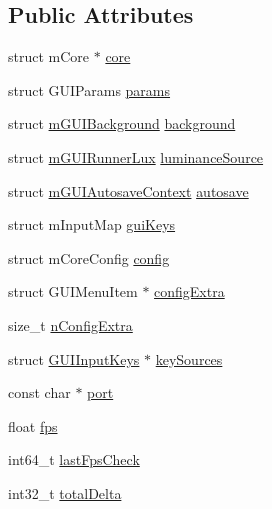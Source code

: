 \subsection*{Public Attributes}
\begin{DoxyCompactItemize}
\item 
struct m\+Core $\ast$ \mbox{\hyperlink{structm_g_u_i_runner_a52a31925364af537d99578c05be47a47}{core}}
\item 
struct G\+U\+I\+Params \mbox{\hyperlink{structm_g_u_i_runner_a83281818205165da912afcfe67b7fbf3}{params}}
\item 
struct \mbox{\hyperlink{gui-runner_8h_structm_g_u_i_background}{m\+G\+U\+I\+Background}} \mbox{\hyperlink{structm_g_u_i_runner_a0f417434c1a9f376e778d385d39953ec}{background}}
\item 
struct \mbox{\hyperlink{gui-runner_8h_structm_g_u_i_runner_lux}{m\+G\+U\+I\+Runner\+Lux}} \mbox{\hyperlink{structm_g_u_i_runner_ae102dc4facc6e333fe1c961279cf8bef}{luminance\+Source}}
\item 
struct \mbox{\hyperlink{gui-runner_8h_structm_g_u_i_autosave_context}{m\+G\+U\+I\+Autosave\+Context}} \mbox{\hyperlink{structm_g_u_i_runner_ae240ad533c323de58caba287697c88de}{autosave}}
\item 
struct m\+Input\+Map \mbox{\hyperlink{structm_g_u_i_runner_a9ceaca50250567be0eb05dbed7d24f22}{gui\+Keys}}
\item 
struct m\+Core\+Config \mbox{\hyperlink{structm_g_u_i_runner_acd48b0c2ab368441512307eafc4b91da}{config}}
\item 
struct G\+U\+I\+Menu\+Item $\ast$ \mbox{\hyperlink{structm_g_u_i_runner_a90ecf79ced741b7b1aee02812fa0163c}{config\+Extra}}
\item 
size\+\_\+t \mbox{\hyperlink{structm_g_u_i_runner_a54ba5f9d02813ed3b5dcbbfbe33ca7d7}{n\+Config\+Extra}}
\item 
struct \mbox{\hyperlink{remap_8h_struct_g_u_i_input_keys}{G\+U\+I\+Input\+Keys}} $\ast$ \mbox{\hyperlink{structm_g_u_i_runner_a580d09813596287456dde1f1b7da3543}{key\+Sources}}
\item 
const char $\ast$ \mbox{\hyperlink{structm_g_u_i_runner_abcc7f6fccde67999c548f62891e64602}{port}}
\item 
float \mbox{\hyperlink{structm_g_u_i_runner_a70d52f6a42123a481384cca59dbdbaf3}{fps}}
\item 
int64\+\_\+t \mbox{\hyperlink{structm_g_u_i_runner_a66dacd4d7106759f8c07ecc68eabf92d}{last\+Fps\+Check}}
\item 
int32\+\_\+t \mbox{\hyperlink{structm_g_u_i_runner_a81bb3da04dc89e32017333bf903485f9}{total\+Delta}}

\end{DoxyCompactItemize}
